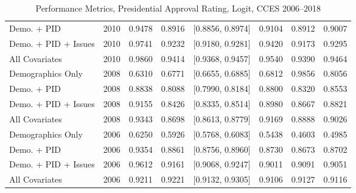 \begin{table}[H]
\begin{tabular}{lrrrlrrr}
  Demo. + PID & 2010 & 0.9478 & 0.8916 & [0.8856, 0.8974] & 0.9104 & 0.8912 & 0.9007 \\ 
  Demo. + PID + Issues & 2010 & 0.9741 & 0.9232 & [0.9180, 0.9281] & 0.9420 & 0.9173 & 0.9295 \\ 
  All Covariates & 2010 & 0.9860 & 0.9414 & [0.9368, 0.9457] & 0.9540 & 0.9390 & 0.9464 \\ 
  Demographics Only & 2008 & 0.6310 & 0.6771 & [0.6655, 0.6885] & 0.6812 & 0.9856 & 0.8056 \\ 
  Demo. + PID & 2008 & 0.8838 & 0.8088 & [0.7990, 0.8184] & 0.8800 & 0.8320 & 0.8553 \\ 
  Demo. + PID + Issues & 2008 & 0.9155 & 0.8426 & [0.8335, 0.8514] & 0.8980 & 0.8667 & 0.8821 \\ 
  All Covariates & 2008 & 0.9343 & 0.8698 & [0.8613, 0.8779] & 0.9169 & 0.8888 & 0.9026 \\ 
  Demographics Only & 2006 & 0.6250 & 0.5926 & [0.5768, 0.6083] & 0.5438 & 0.4603 & 0.4985 \\ 
  Demo. + PID & 2006 & 0.9354 & 0.8861 & [0.8756, 0.8960] & 0.8730 & 0.8673 & 0.8702 \\ 
  Demo. + PID + Issues & 2006 & 0.9612 & 0.9161 & [0.9068, 0.9247] & 0.9011 & 0.9091 & 0.9051 \\ 
  All Covariates & 2006 & 0.9211 & 0.9221 & [0.9132, 0.9305] & 0.9106 & 0.9127 & 0.9116 \\ 
   \bottomrule
\end{tabular}
\caption{Performance Metrics, Presidential Approval Rating, Logit, CCES 2006--2018} 
\label{tab:cces_presapprov_logit}
\end{table}
